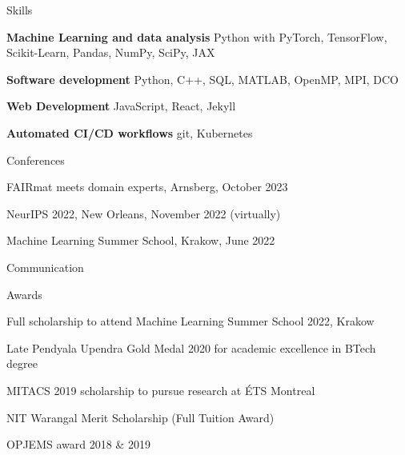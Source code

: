\documentclass{cv}
\begin{document}
  \begin{rSection}{Skills} \itemsep -4pt 
    \item \textbf{Machine Learning and data analysis} \textemdash  Python with PyTorch, TensorFlow, Scikit-Learn, Pandas, NumPy, SciPy, JAX
    \item \textbf{Software development} \textemdash Python, C++, SQL, MATLAB, OpenMP, MPI, DCO
    \item \textbf{Web Development} \textemdash JavaScript, React, Jekyll
    \item \textbf{Automated CI/CD workflows} \textemdash git, Kubernetes
  \end{rSection}

  \begin{rSection}{Conferences} \itemsep -4pt 
    \item FAIRmat meets domain experts, Arnsberg, October 2023
    \item NeurIPS 2022, New Orleans, November 2022 (virtually)
    \item Machine Learning Summer School, Krakow, June 2022
  \end{rSection}
  
  \begin{rSection}{Communication}%
    \item {}
    \item {}
    \item {}
    \item {}
  \end{rSection}
  
  \begin{rSection}{Awards} \itemsep -4pt 
    \item Full scholarship to attend Machine Learning Summer School 2022, Krakow
    \item Late Pendyala Upendra Gold Medal 2020 for academic excellence in BTech degree
    \item MITACS 2019 scholarship to pursue research at ÉTS Montreal \hfill 
    \item NIT Warangal Merit Scholarship (Full Tuition Award)
    \item OPJEMS award 2018 \& 2019 \hfill 
  \end{rSection}
  
\end{document}
